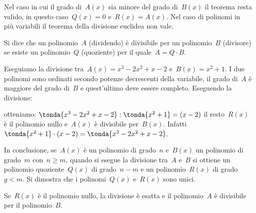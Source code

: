 \osservazione Nel caso in cui il grado di~\(A(x)\) sia minore del grado 
di~\(B(x)\) il teorema resta valido, in questo caso~\(Q(x)=0\) e~\(R(x)=A(x)\).
Nel caso di polinomi in più variabili il teorema della divisione euclidea non 
vale.

\begin{definizione}
 Si dice che un polinomio~\(A\) (dividendo) è divisibile per un polinomio~\(B\) 
 (divisore) se esiste un polinomio~\(Q\) (quoziente) per il quale~\(A=Q\cdot 
B\).
\end{definizione}

 \begin{esempio}
 Eseguiamo la divisione tra~\(A(x)=x^3-2x^2+x-2\) e~\(B(x)=x^2+1\).
I due polinomi sono ordinati secondo potenze decrescenti della variabile, 
il grado di~\(A\) è maggiore del grado di~\(B\) e quest'ultimo
deve essere completo. 
Eseguendo la divisione: 
\begin{center}
\divdue
\end{center}
 \end{esempio}
otteniamo:
\(\tonda{x^3-2x^2+x-2}:\tonda{x^2+1}=(x-2)\) 
il resto~\(R(x)\) è il polinomio nullo e~\(A(x)\) è divisibile per~\(B(x)\).
Infatti~\(\tonda{x^2+1}\cdot (x-2)=\tonda{x^3-2x^2+x-2}\).

In conclusione, se~\(A(x)\) è un polinomio di grado~\(n\) e~\(B(x)\) un 
polinomio di grado~\(m\) con~\(n\ge m\), quando si esegue la divisione 
tra~\(A\) e~\(B\) si ottiene un polinomio quoziente~\(Q(x)\) di grado~\(n-m\) 
e un polinomio~\(R(x)\) di grado~\(g<m\).
Si dimostra che i polinomi~\(Q(x)\) e~\(R(x)\) sono unici.

Se~\(R(x)\) è il polinomio nullo, la divisione è esatta e il polinomio~\(A\) 
è divisibile per il polinomio~\(B\).


